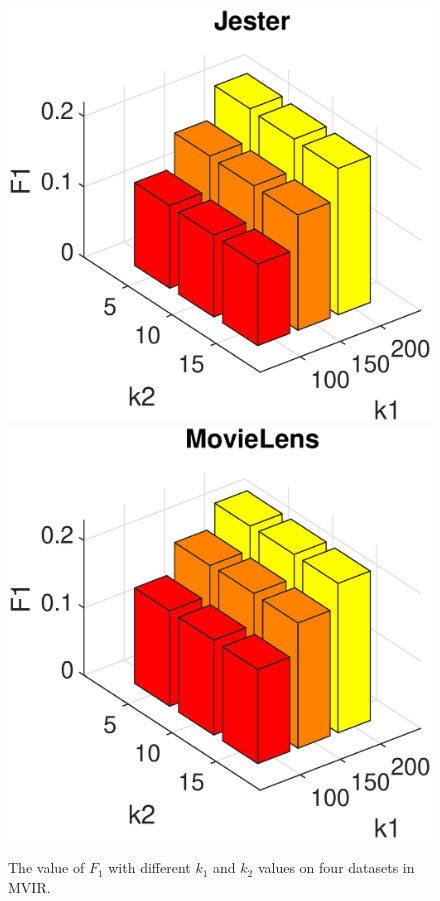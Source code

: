 \documentclass{beamer}
\begin{document}
\begin{frame}
\begin{figure}[h]
\begin{center}
{\includegraphics[width=0.24\linewidth]{Figures/Jester_k_F1.eps}\label{fig:kF1jester}}
{\includegraphics[width=0.24\linewidth]{Figures/MovieLens_k_F1.eps}\label{fig:kF1movielens}}
\caption{The value of $F_1$ with different $k_1$ and $k_2$ values on four datasets in MVIR.}
\label{fig:kF1}
\end{center}
\end{figure}

\end{frame}
\end{document}
